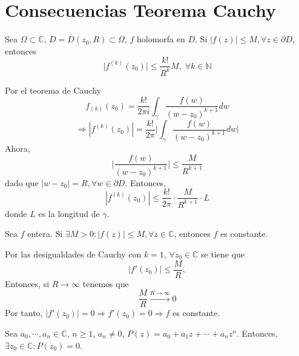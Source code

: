 \section{Consecuencias Teorema Cauchy}

\begin{theo}
  Sea $\Omega \subset \mathbb{C}$,  $D = \overline{D}(z_{0},R) \subset \Omega$, $f$ holomorfa en $D$. Si $| f(z) | \leq M, \forall z \in \partial{D}$, entonces
  \[ 
    \big | f^{(k)}(z_{0}) \big | \leq \frac{k!}{R^{k}}M, \; \forall k \in \mathbb{N}
  \] 
\end{theo}

\begin{dem}
  Por el teorema de Cauchy
  \[ 
    f_{(k)}(z_{0}) = \frac{k!}{2 \pi i} \int_{\gamma}^{} \frac{f(w)}{(w - z_{0})^{k+1}} dw 
  \] 
  \[ 
    \Rightarrow | f^{(k)}(z_{0}) | = \frac{k!}{2 \pi} \Big | \int_{\gamma}^{} \frac{f(w)}{(w - z_{0})^{k+1}} dw \Big |
  \] 
  Ahora,
  \[ 
    \Big | \frac{f(w)}{(w - z_{0})^{k+1}} \Big | \leq \frac{M}{R^{k+1}}
  \] 
  dado que $| w - z_{0} | = R, \forall w \in \partial D$. Entonces,
  \[ 
     | f^{(k)}(z_{0}) | \leq \frac{k!}{2 \pi} \cdot \frac{M}{R^{k+1}} \cdot L
  \] 
  donde $L$ es la longitud de $\gamma$.
\end{dem}

\begin{theo}[Liouville]
  Sea $f$ entera. Si $\exists M >0 : | f(z) |\leq M, \forall z \in \mathbb{C}$, entonces $f$ es constante.
\end{theo}

\begin{dem}
  Por las desigualdades de Cauchy con $k = 1$, $\forall z_{0} \in \mathbb{C}$ se tiene que
  \[
    | f'(z_{0}) | \leq \frac{M}{R},
  \]
  Entonces, si $R \rightarrow \infty$ tenemos que
  \[
    \frac{M}{R} \xrightarrow[]{ R \rightarrow \infty } 0
  \]
  Por tanto, $| f'(z_{0}) | = 0 \Rightarrow f'(z_{0}) = 0 \Rightarrow f$ es constante.
\end{dem}

\begin{theo}
  Sea $a_{0}, \cdots, a_{n} \in \mathbb{C}$, $n \geq 1$, $a_{n} \neq 0$, $P(z) = a_{0} + a_{1} z + \cdots + a_{n} z^{n}$. Entonces, $\exists z_{0} \in \mathbb{C}: P(z_{0}) = 0$.
\end{theo}

